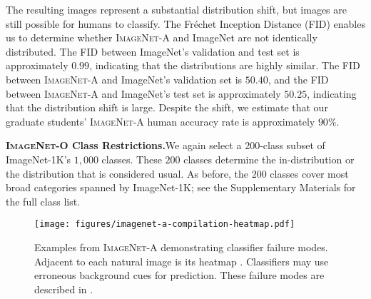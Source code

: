 \documentclass[10pt,twocolumn,letterpaper]{article}
\begin{document}
The resulting images represent a substantial distribution shift, but images are still possible for humans to classify. The Fr\'echet Inception Distance (FID) \cite{Heusel2017GANsTB} enables us to determine whether \textsc{ImageNet-A} and ImageNet are not identically distributed. The FID between ImageNet’s validation and test set is approximately $0.99$, indicating that the distributions are highly similar. The FID between \textsc{ImageNet-A} and ImageNet’s validation set is $50.40$, and the FID between \textsc{ImageNet-A} and ImageNet's test set is approximately $50.25$, indicating that the distribution shift is large. Despite the shift, we estimate that our graduate students' \textsc{ImageNet-A} human accuracy rate is approximately $90\%$.

\noindent\textbf{\textsc{ImageNet-O} Class Restrictions.}\quad We again select a 200-class subset of ImageNet-1K's $1,000$ classes. These $200$ classes determine the in-distribution or the distribution that is considered usual. As before, the $200$ classes cover most broad categories spanned by ImageNet-1K; see the Supplementary Materials for the full class list. 

\begin{figure*}[t]
\vspace{-25pt}
\centering
\texttt{[image: figures/imagenet-a-compilation-heatmap.pdf]}
\caption{
Examples from \textsc{ImageNet-A} demonstrating classifier failure modes. Adjacent to each natural image is its heatmap \cite{Selvaraju2019GradCAMVE}. Classifiers may use erroneous background cues for prediction. These failure modes are described in .
}\label{fig:compilation}
\vspace{-10pt}
\end{figure*}
\end{document}
